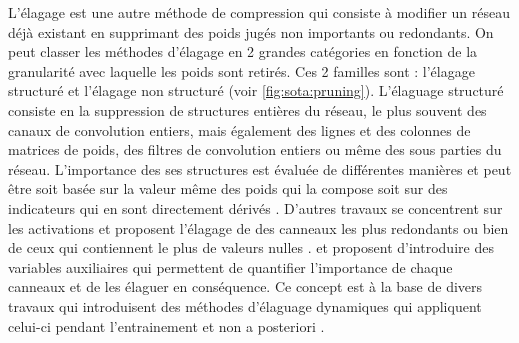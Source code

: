 L'élagage est une autre méthode de compression qui consiste à modifier un réseau
déjà existant en supprimant des poids jugés non importants ou redondants. On
peut classer les méthodes d'élagage en 2 grandes catégories en fonction de la
granularité avec laquelle les poids sont retirés. Ces 2 familles sont :
l'élagage structuré et l'élagage non structuré (voir \cref{fig:sota:pruning}).
L'élaguage structuré consiste en la suppression de structures entières du
réseau, le plus souvent des canaux de convolution entiers, mais également des
lignes et des colonnes de matrices de poids, des filtres de convolution entiers
ou même des sous parties du réseau. L'importance des ses structures est évaluée
de différentes manières et peut être soit basée sur la valeur même des poids qui
la compose \cite{DBLP:conf/iclr/0022KDSG17} soit sur des indicateurs qui en sont
directement dérivés \cite{DBLP:conf/cvpr/HeLWHY19,DBLP:conf/cvpr/WangLW21}.
D'autres travaux se concentrent sur les activations et proposent l'élagage de
des canneaux les plus redondants \cite{DBLP:conf/iccv/HeZS17} ou bien de ceux
qui contiennent le plus de valeurs nulles \cite{DBLP:journals/corr/HuPTT16}.
\cite{DBLP:conf/iccv/LiuLSHYZ17} et \cite{DBLP:conf/nips/YouYYM019} proposent
d'introduire des variables auxiliaires qui permettent de quantifier l'importance
de chaque canneaux et de les élaguer en conséquence. Ce concept est à la base de
divers travaux qui introduisent des méthodes d'élaguage dynamiques qui
appliquent celui-ci pendant l'entrainement et non a posteriori
\cite{DBLP:conf/nips/GuoYC16,DBLP:conf/ijcai/HeKDFY18}.\\

